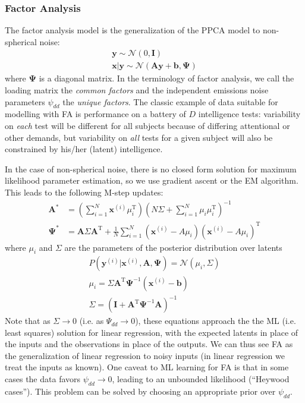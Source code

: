\documentclass[a4paper]{article}
\begin{document}
\subsubsection{Factor Analysis}
The factor analysis model is the generalization of the PPCA model to non-spherical noise:
\begin{gather*}
\mathbf{y} \sim \mathcal{N}(0,\mathbf{I}) \\
\mathbf{x}|\mathbf{y} \sim \mathcal{N}(\mathbf{Ay+b},\mathbf{\Psi})
\end{gather*}
where $\mathbf{\Psi}$ is a diagonal matrix. In the terminology of factor analysis, we call the loading matrix the \emph{common factors} and the independent emissions noise parameters $\psi_{dd}$ the \emph{unique factors}. The classic example of data suitable for modelling with FA is performance on a battery of $D$ intelligence tests: variability on \emph{each} test will be different for all subjects because of differing attentional or other demands, but variability on \emph{all} tests for a given subject will also be constrained by his/her (latent) intelligence.

In the case of non-spherical noise, there is no closed form solution for maximum likelihood parameter estimation, so we use gradient ascent or the EM algorithm. This leads to the following M-step updates:
\begin{align*}
\mathbf{A}^* &= \left(\sum_{i=1}^N \mathbf{x}^{(i)}\mu_i^\textrm{T}\right)\left(N\Sigma + \sum_{i=1}^N\mu_i\mu_i^\textrm{T}\right)^{-1} \\
\mathbf{\Psi}^* &= \mathbf{A}\Sigma\mathbf{A}^\textrm{T} + \frac{1}{N}\sum_{i=1}^N (\mathbf{x}^{(i)} - A\mu_i)(\mathbf{x}^{(i)} - A\mu_i)^\textrm{T}
\end{align*}
where $\mu_i$ and $\Sigma$ are the parameters of the posterior distribution over latents
\begin{gather*}
P(\mathbf{y}^{(i)}|\mathbf{x}^{(i)},\mathbf{A},\mathbf{\Psi}) = \mathcal{N}(\mu_i,\Sigma) \\
\mu_i = \Sigma \mathbf{A}^\textrm{T}\mathbf{\Psi}^{-1}(\mathbf{x}^{(i)} - \mathbf{b}) \\
\Sigma = (\mathbf{I} + \mathbf{A}^\textrm{T}\mathbf{\Psi}^{-1}\mathbf{A})^{-1}
\end{gather*}
Note that as $\Sigma \rightarrow 0$ (i.e. as $\Psi_{dd} \rightarrow 0$), these equations approach the the ML (i.e. least squares) solution for linear regression, with the expected latents in place of the inputs and the observations in place of the outputs. We can thus see FA as the generalization of linear regression to noisy inputs (in linear regression we treat the inputs as known). One caveat to ML learning for FA is that in some cases the data favors $\psi_{dd}\rightarrow 0$, leading to an unbounded likelihood (``Heywood cases''). This problem can be solved by choosing an appropriate prior over $\psi_{dd}$.
\end{document}

